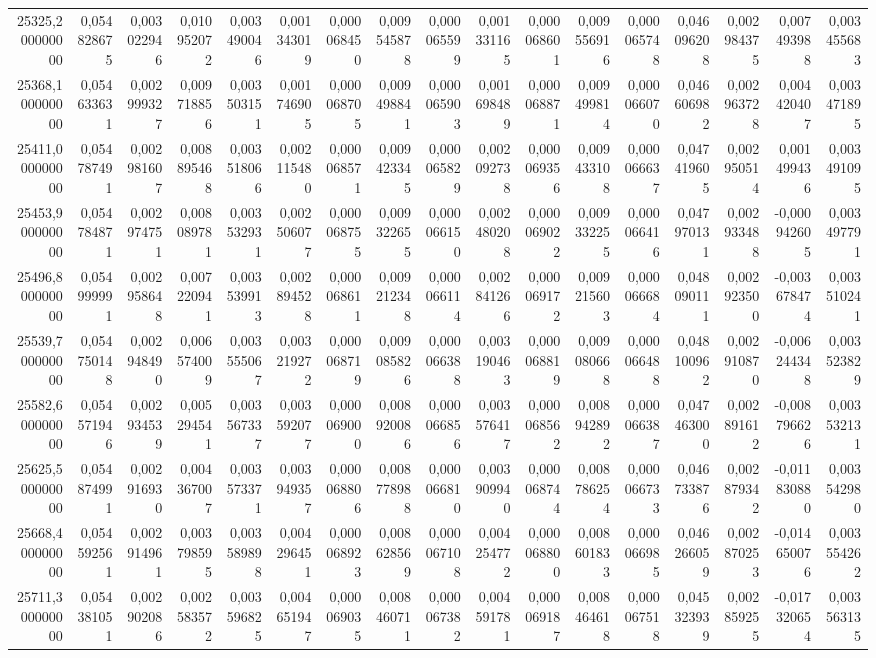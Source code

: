 \begin{longtable}{rrrrrrrrrrrrrrrrr}
25325,200000000 & 0,054828675 & 0,003022946 & 0,010952072 & 0,003490046 & 0,001343019 & 0,000068450 & 0,009545878 & 0,000065599 & 0,001331165 & 0,000068601 & 0,009556916 & 0,000065748 & 0,046096208 & 0,002984375 & 0,007493988 & 0,003455683\\
25368,100000000 & 0,054633631 & 0,002999327 & 0,009718856 & 0,003503151 & 0,001746905 & 0,000068705 & 0,009498841 & 0,000065903 & 0,001698489 & 0,000068871 & 0,009499814 & 0,000066070 & 0,046606982 & 0,002963728 & 0,004420407 & 0,003471895\\
25411,000000000 & 0,054787491 & 0,002981607 & 0,008895468 & 0,003518066 & 0,002115480 & 0,000068571 & 0,009423345 & 0,000065829 & 0,002092738 & 0,000069356 & 0,009433108 & 0,000066637 & 0,047419605 & 0,002950514 & 0,001499436 & 0,003491095\\
25453,900000000 & 0,054784871 & 0,002974751 & 0,008089781 & 0,003532931 & 0,002506077 & 0,000068755 & 0,009322655 & 0,000066150 & 0,002480208 & 0,000069022 & 0,009332255 & 0,000066416 & 0,047970131 & 0,002933488 & -0,000942605 & 0,003497791\\
25496,800000000 & 0,054999991 & 0,002958648 & 0,007220941 & 0,003539913 & 0,002894528 & 0,000068611 & 0,009212348 & 0,000066114 & 0,002841266 & 0,000069172 & 0,009215603 & 0,000066684 & 0,048090111 & 0,002923500 & -0,003678474 & 0,003510241\\
25539,700000000 & 0,054750148 & 0,002948490 & 0,006574009 & 0,003555067 & 0,003219272 & 0,000068719 & 0,009085826 & 0,000066388 & 0,003190463 & 0,000068819 & 0,009080668 & 0,000066488 & 0,048100962 & 0,002910870 & -0,006244348 & 0,003523829\\
25582,600000000 & 0,054571946 & 0,002934539 & 0,005294541 & 0,003567337 & 0,003592077 & 0,000069000 & 0,008920086 & 0,000066856 & 0,003576417 & 0,000068562 & 0,008942892 & 0,000066387 & 0,047463000 & 0,002891612 & -0,008796626 & 0,003532131\\
25625,500000000 & 0,054874991 & 0,002916930 & 0,004367007 & 0,003573371 & 0,003949357 & 0,000068806 & 0,008778988 & 0,000066810 & 0,003909940 & 0,000068744 & 0,008786254 & 0,000066733 & 0,046733876 & 0,002879342 & -0,011830880 & 0,003542980\\
25668,400000000 & 0,054592561 & 0,002914961 & 0,003798595 & 0,003589898 & 0,004296451 & 0,000068923 & 0,008628569 & 0,000067108 & 0,004254772 & 0,000068800 & 0,008601833 & 0,000066985 & 0,046266059 & 0,002870253 & -0,014650076 & 0,003554262\\
25711,300000000 & 0,054381051 & 0,002902086 & 0,002583572 & 0,003596825 & 0,004651947 & 0,000069035 & 0,008460711 & 0,000067382 & 0,004591781 & 0,000069187 & 0,008464618 & 0,000067518 & 0,045323939 & 0,002859255 & -0,017320654 & 0,003563135\\

\end{longtable}
